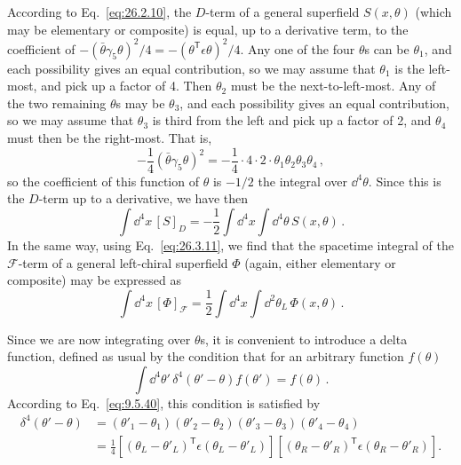 According to Eq.~\eqref{eq:26.2.10}, the \(D\)-term of a general superfield
\(S(x,\theta)\) (which may be elementary or composite) is equal, up to a
derivative term, to the coefficient of
\(-(\bar\theta\gamma_5\theta)^2/4=-(\theta^{\mathsf T}\epsilon\theta)^2/4\). Any one of
the four \(\theta\)s can be \(\theta_1\), and each possibility gives an equal
contribution, so we may assume that \(\theta_1\) is the left-most, and pick up
a factor of 4. Then \(\theta_2\) must be the next-to-left-most. Any of the two
remaining \(\theta\)s may be \(\theta_3\), and each possibility gives an equal
contribution, so we may assume that \(\theta_3\) is third from the left and
pick up a factor of 2, and \(\theta_4\) must then be the right-most. That is,
\[
  -\frac14(\bar\theta\gamma_5\theta)^2
  =-\frac14\cdot4\cdot2\cdot\theta_1\theta_2\theta_3\theta_4\,,
\]
so the coefficient of this function of \(\theta\) is \(-1/2\) the integral
over \(\dd^4\theta\). Since this is the \(D\)-term up to a derivative, we have
then
\begin{equation}
  \int \dd^4x\,[S]_D
  =-\frac12\int \dd^4x\int \dd^4\theta\,S(x,\theta)\,.
  \tag{26.6.5}\label{eq:26.6.5}
\end{equation}
In the same way, using Eq.~\eqref{eq:26.3.11}, we find that the spacetime
integral of the \(\mathcal{F}\)-term of a general left-chiral superfield
\(\Phi\) (again, either elementary or composite) may be expressed as
\begin{equation}
  \int \dd^4x\,[\Phi]_{\mathcal{F}}
  =\frac12\int \dd^4x\int \dd^2\theta_L\,\Phi(x,\theta)\,.
  \tag{26.6.6}\label{eq:26.6.6}
\end{equation}

Since we are now integrating over \(\theta\)s, it is convenient to introduce
a delta function, defined as usual by the condition that for an arbitrary
function \(f(\theta)\)
\begin{equation}
  \int \dd^4\theta'\,\delta^4(\theta'-\theta)f(\theta')=f(\theta)\,.
  \tag{26.6.7}\label{eq:26.6.7}
\end{equation}
According to Eq.~\eqref{eq:9.5.40}, this condition is satisfied by
\begin{equation}
  \begin{aligned}
  \delta^4(\theta'-\theta)
  &=(\theta'_1-\theta_1)(\theta'_2-\theta_2)
    (\theta'_3-\theta_3)(\theta'_4-\theta_4)
  \\
  &=\frac14
    \left[(\theta_L-\theta'_L)^{\mathsf T}\epsilon(\theta_L-\theta'_L)\right]
    \left[(\theta_R-\theta'_R)^{\mathsf T}\epsilon(\theta_R-\theta'_R)\right].
  \end{aligned}
  \tag{26.6.8}\label{eq:26.6.8}
\end{equation}

